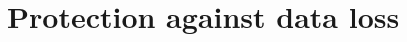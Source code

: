 \documentclass[Main]{subfiles}
\begin{document}
\section{Protection against data loss}
\end{document}
